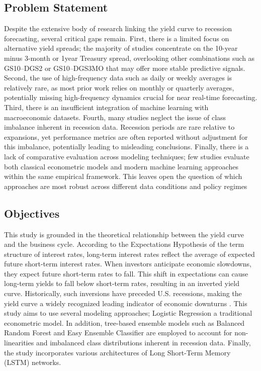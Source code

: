 \subsection{Problem Statement}

Despite the extensive body of research linking the yield curve to recession forecasting, several critical gaps remain. First, there is a limited focus on alternative yield spreads; the majority of studies concentrate on the 10-year minus 3-month or 1year Treasury spread, overlooking other combinations such as GS10–DGS2 or GS10–DGS3MO that may offer more stable predictive signals. Second, the use of high-frequency data such as daily or weekly averages is relatively rare, as most prior work relies on monthly or quarterly averages, potentially missing high-frequency dynamics crucial for near real-time forecasting. Third, there is an insufficient integration of machine learning with macroeconomic datasets. Fourth, many studies neglect the issue of class imbalance inherent in recession data. Recession periods are rare relative to expansions, yet performance metrics are often reported without adjustment for this imbalance, potentially leading to misleading conclusions. Finally, there is a lack of comparative evaluation across modeling techniques; few studies evaluate both classical econometric models and modern machine learning approaches within the same empirical framework. This leaves open the question of which approaches are most robust across different data conditions and policy regimes


\subsection{Objectives}

This study is grounded in the theoretical relationship between the yield curve and the business cycle. According to the Expectations Hypothesis of the term structure of interest rates, long-term interest rates reflect the average of expected future short-term interest rates. When investors anticipate economic slowdowns, they expect future short-term rates to fall. This shift in expectations can cause long-term yields to fall below short-term rates, resulting in an inverted yield curve. 
Historically, such inversions have preceded U.S. recessions, making the yield curve a widely recognized leading indicator of economic downturns \parencite{estrella1998predicting}. This study aims to use several modeling approaches; Logistic Regression a traditional econometric model. In addition, tree-based ensemble models such as Balanced Random Forest and Easy Ensemble Classifier are employed to account for non-linearities and imbalanced class distributions inherent in recession data. Finally, the study incorporates various architectures of Long Short-Term Memory (LSTM) networks.







